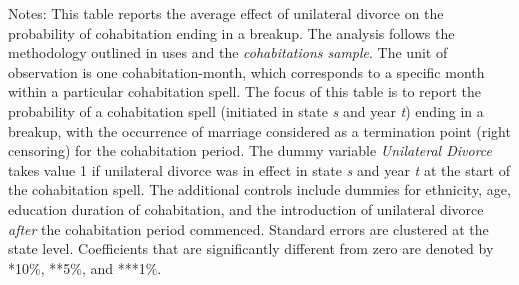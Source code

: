 \begin{table}[H]\centering                                  \scriptsize                                 \caption{The average effect of unilateral divorce on the probability that a cohabitation spell ends in a breakup. Unit of observation: cohabitation-month}                                   \label{tab:tabdurb}                                 
\begin{minipage}{\textwidth}
\scriptsize\smallskip
Notes: This table reports the average effect of unilateral divorce on the probability of cohabitation ending in a breakup. The analysis follows the methodology outlined in \cite{borusyak2021} uses and the \textit{cohabitations sample}. The unit of observation is one cohabitation-month, which corresponds to a specific month within a particular cohabitation spell. The focus of this table is to report the probability of a cohabitation spell (initiated in state \textit{s} and year \textit{t}) ending in a breakup, with the occurrence of marriage considered as a termination point (right censoring) for the cohabitation period. The dummy variable \textit{Unilateral Divorce} takes value 1 if unilateral divorce was in effect in state \textit{s} and year \textit{t} at the start of the cohabitation spell. The additional controls include dummies for ethnicity, age, education duration of cohabitation, and the introduction of unilateral divorce \textit{after} the cohabitation period commenced. Standard errors are clustered at the state level. Coefficients that are significantly different from zero are denoted by *10\%, **5\%, and ***1\%.
\\
\end{minipage}\vspace{-6mm}
\end{table}
